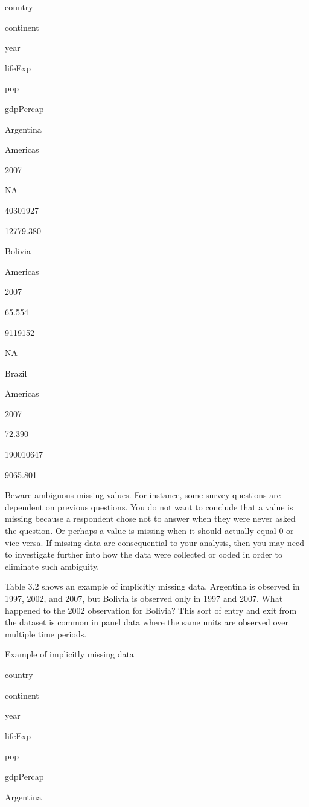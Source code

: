 \documentclass[
]{book}
\newenvironment{announcement}%
{%
  \par\vspace{\baselineskip}\noindent 
  \color{Announcement}\begin{itshape}%
  \par\vspace{\baselineskip}\noindent\ignorespaces 
}%
{%
  \end{itshape}\ignorespacesafterend 
}
\begin{document}
country

continent

year

lifeExp

pop

gdpPercap

Argentina

Americas

2007

NA

40301927

12779.380

Bolivia

Americas

2007

65.554

9119152

NA

Brazil

Americas

2007

72.390

190010647

9065.801

\begin{announcement}
Beware ambiguous missing values. For instance, some survey questions are
dependent on previous questions. You do not want to conclude that a
value is missing because a respondent chose not to answer when they were
never asked the question. Or perhaps a value is missing when it should
actually equal 0 or vice versa. If missing data are consequential to
your analysis, then you may need to investigate further into how the
data were collected or coded in order to eliminate such ambiguity.
\end{announcement}

Table 3.2 shows an example of implicitly missing data. Argentina is observed in 1997, 2002, and 2007, but Bolivia is observed only in 1997 and 2007. What happened to the 2002 observation for Bolivia? This sort of entry and exit from the dataset is common in panel data where the same units are observed over multiple time periods.

\label{tab:unnamed-chunk-10}Example of implicitly missing data

country

continent

year

lifeExp

pop

gdpPercap

Argentina
\end{document}
